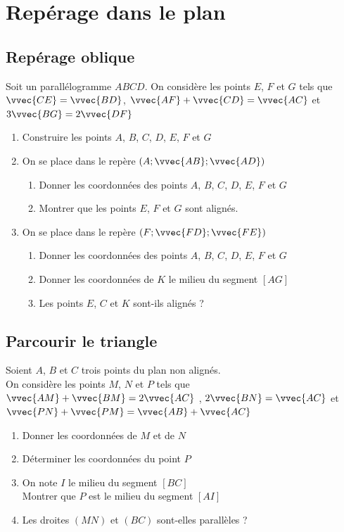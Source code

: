 \documentclass[oneside,12pt]{book}          %
\begin{document}
\section{Repérage dans le plan}

\subsection{Repérage oblique}
Soit un parallélogramme $ABCD$. On considère les points $E$, $F$ et $G$ tels que $\vvec{CE}=\vvec{BD}$, $\vvec{AF}+\vvec{CD}=\vvec{AC}$ et $3\vvec{BG}=2\vvec{DF}$
\begin{enumerate}
    \item Construire les points $A$, $B$, $C$, $D$, $E$, $F$ et $G$
    \item On se place dans le repère $(A;\vvec{AB};\vvec{AD})$
    \begin{enumerate}
        \item Donner les coordonnées des points $A$, $B$, $C$, $D$, $E$, $F$ et $G$
        \item Montrer que les points $E$, $F$ et $G$ sont alignés.
    \end{enumerate}
    \item On se place dans le repère $(F;\vvec{FD};\vvec{FE})$
    \begin{enumerate}
        \item Donner les coordonnées des points $A$, $B$, $C$, $D$, $E$, $F$ et $G$
        \item Donner les coordonnées de $K$ le milieu du segment $[AG]$
        \item Les points $E$, $C$ et $K$ sont-ils alignés ?
    \end{enumerate}
\end{enumerate}



\subsection{Parcourir le triangle}
Soient $A$, $B$ et $C$ trois points du plan non alignés.\\
On considère les points $M$, $N$ et $P$ tels que $\vvec{AM}+\vvec{BM}=2\vvec{AC}$ , $2\vvec{BN}=\vvec{AC}$ et $\vvec{PN}+\vvec{PM}=\vvec{AB}+\vvec{AC}$
\begin{enumerate}
    \item Donner les coordonnées de $M$ et de $N$
    \item Déterminer les coordonnées du point $P$
    \item On note $I$ le milieu du segment $[BC]$\\
    Montrer que $P$ est le milieu du segment $[AI]$
    \item Les droites $(MN)$ et $(BC)$ sont-elles parallèles ?
\end{enumerate}
\end{document}
